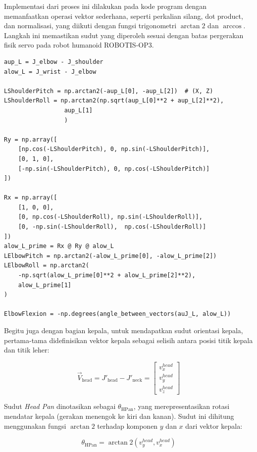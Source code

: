 Implementasi dari proses ini dilakukan pada kode program dengan memanfaatkan operasi vektor sederhana, seperti perkalian silang, dot product, dan normalisasi, yang diikuti dengan fungsi trigonometri $\arctan2$ dan $\arccos$. Langkah ini memastikan sudut yang diperoleh sesuai dengan batas pergerakan fisik servo pada robot humanoid ROBOTIS-OP3.


\begin{lstlisting}[style=plainbox, caption={Implementasi perhitungan sudut sendi sesuai rumus}]
aup_L = J_elbow - J_shoulder
alow_L = J_wrist - J_elbow

LShoulderPitch = np.arctan2(-aup_L[0], -aup_L[2])  # (X, Z)
LShoulderRoll = np.arctan2(np.sqrt(aup_L[0]**2 + aup_L[2]**2),
                 aup_L[1]
                 )

Ry = np.array([
    [np.cos(-LShoulderPitch), 0, np.sin(-LShoulderPitch)],
    [0, 1, 0],
    [-np.sin(-LShoulderPitch), 0, np.cos(-LShoulderPitch)]
])

Rx = np.array([
    [1, 0, 0],
    [0, np.cos(-LShoulderRoll), np.sin(-LShoulderRoll)],
    [0, -np.sin(-LShoulderRoll),  np.cos(-LShoulderRoll)]
])
alow_L_prime = Rx @ Ry @ alow_L
LElbowPitch = np.arctan2(-alow_L_prime[0], -alow_L_prime[2])
LElbowRoll = np.arctan2(
    -np.sqrt(alow_L_prime[0]**2 + alow_L_prime[2]**2),
    alow_L_prime[1]
)

ElbowFlexion = -np.degrees(angle_between_vectors(auJ_L, alow_L))
\end{lstlisting}
Begitu juga dengan bagian kepala, untuk mendapatkan sudut orientasi kepala, pertama-tama didefinisikan vektor kepala sebagai selisih antara posisi titik kepala dan titik leher:

\begin{equation}
\vec{V}_{\text{head}} = J'_{\text{head}} - J'_{\text{neck}} = 
\begin{bmatrix}
v^{head}_x \\[3pt]
v^{head}_y \\[3pt]
v^{head}_z
\end{bmatrix}
\end{equation}

Sudut \textit{Head Pan} dinotasikan sebagai $\theta_{\text{HPan}}$, yang merepresentasikan rotasi mendatar kepala (gerakan menengok ke kiri dan kanan). Sudut ini dihitung menggunakan fungsi $\arctan2$ terhadap komponen $y$ dan $x$ dari vektor kepala:

\begin{equation}
\theta_{\text{HPan}} = \arctan2\left(v^{head}_y, v^{head}_x\right)
\end{equation}


